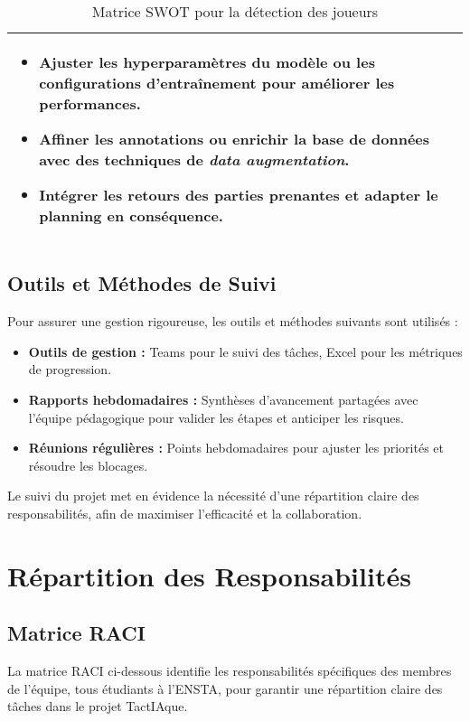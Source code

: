 \begin{table}
\begin{tabular}{|p{7cm}|p{7cm}|}
\begin{itemize}
        \item Ajuster les hyperparamètres du modèle ou les configurations d’entraînement pour améliorer les performances. 
        \item Affiner les annotations ou enrichir la base de données avec des techniques de \emph{data augmentation}.
        \item Intégrer les retours des parties prenantes et adapter le planning en conséquence. 
    \end{itemize}\\
    \hline  
    \end{tabular}  
    \caption{Matrice SWOT pour la détection des joueurs}  
\end{table}  

\subsection{Outils et Méthodes de Suivi}
Pour assurer une gestion rigoureuse, les outils et méthodes suivants sont utilisés :
\begin{itemize}
    \item \textbf{Outils de gestion :} Teams pour le suivi des tâches, Excel pour les métriques de progression.
    \item \textbf{Rapports hebdomadaires :} Synthèses d’avancement partagées avec l’équipe pédagogique pour valider les étapes et anticiper les risques.
    \item \textbf{Réunions régulières :} Points hebdomadaires pour ajuster les priorités et résoudre les blocages.
\end{itemize}

Le suivi du projet met en évidence la nécessité d'une répartition claire des responsabilités, afin de maximiser l'efficacité et la collaboration.

\section{Répartition des Responsabilités}

\subsection{Matrice RACI}
La matrice RACI ci-dessous identifie les responsabilités spécifiques des membres de l'équipe, tous étudiants à l'ENSTA, pour garantir une répartition claire des tâches dans le projet TactIAque.


